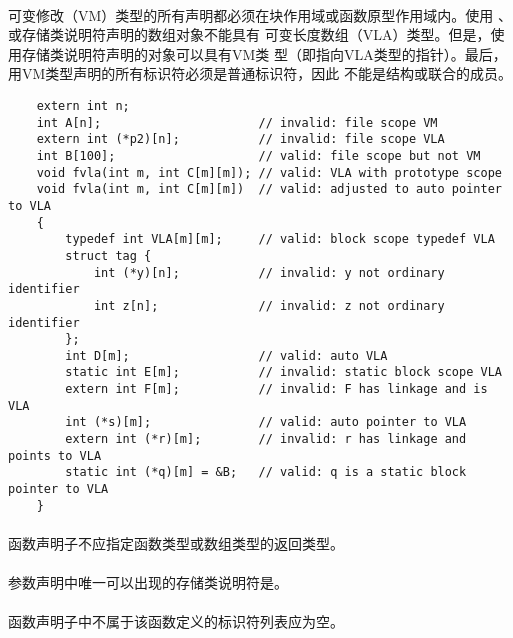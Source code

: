 {\paragraph{}
\ex 可变修改（VM）类型的所有声明都必须在块作用域或函数原型作用域内。使用
、或存储类说明符声明的数组对象不能具有
可变长度数组（VLA）类型。但是，使用存储类说明符声明的对象可以具有VM类
型（即指向VLA类型的指针）。最后，用VM类型声明的所有标识符必须是普通标识符，因此
不能是结构或联合的成员。
\begin{lstlisting}
    extern int n;
    int A[n];                      // invalid: file scope VM
    extern int (*p2)[n];           // invalid: file scope VLA
    int B[100];                    // valid: file scope but not VM
    void fvla(int m, int C[m][m]); // valid: VLA with prototype scope
    void fvla(int m, int C[m][m])  // valid: adjusted to auto pointer to VLA
    {
        typedef int VLA[m][m];     // valid: block scope typedef VLA
        struct tag {
            int (*y)[n];           // invalid: y not ordinary identifier
            int z[n];              // invalid: z not ordinary identifier
        };
        int D[m];                  // valid: auto VLA
        static int E[m];           // invalid: static block scope VLA
        extern int F[m];           // invalid: F has linkage and is VLA
        int (*s)[m];               // valid: auto pointer to VLA
        extern int (*r)[m];        // invalid: r has linkage and points to VLA
        static int (*q)[m] = &B;   // valid: q is a static block pointer to VLA
    }
\end{lstlisting}


\constraint
\paragraph{}
函数声明子不应指定函数类型或数组类型的返回类型。

\paragraph{}
参数声明中唯一可以出现的存储类说明符是。

\paragraph{}
函数声明子中不属于该函数定义的标识符列表应为空。

}
